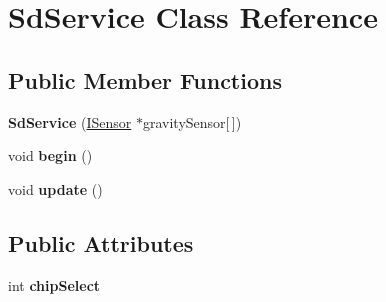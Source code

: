 \hypertarget{class_sd_service}{}\section{Sd\+Service Class Reference}
\label{class_sd_service}
\subsection*{Public Member Functions}
\begin{DoxyCompactItemize}
\item 
{\bfseries Sd\+Service} (\hyperlink{class_i_sensor}{I\+Sensor} $\ast$gravity\+Sensor\mbox{[}$\,$\mbox{]})\hypertarget{class_sd_service_afed7960e6a28c171ffe552c88cfe4624}{}\label{class_sd_service_afed7960e6a28c171ffe552c88cfe4624}

\item 
void {\bfseries begin} ()\hypertarget{class_sd_service_a5c6e09a57f22f163676a51eab6f933c5}{}\label{class_sd_service_a5c6e09a57f22f163676a51eab6f933c5}

\item 
void {\bfseries update} ()\hypertarget{class_sd_service_a776b1a8d229b9b0bc44cbf6ae9b37c9d}{}\label{class_sd_service_a776b1a8d229b9b0bc44cbf6ae9b37c9d}

\end{DoxyCompactItemize}
\subsection*{Public Attributes}
\begin{DoxyCompactItemize}
\item 
int {\bfseries chip\+Select}\hypertarget{class_sd_service_a173f33cc9797e3ce4e213a75e627d2c9}{}\label{class_sd_service_a173f33cc9797e3ce4e213a75e627d2c9}

\end{DoxyCompactItemize}
